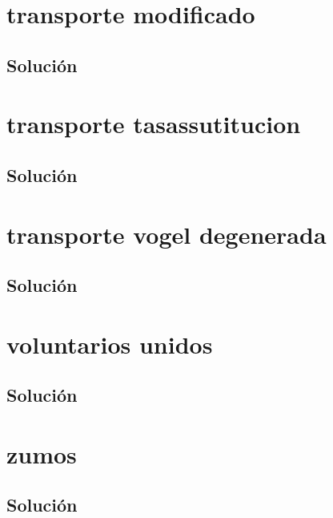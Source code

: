 \documentclass[a4paper,10pt,onecolumn]{report}
\begin{document}
\section{transporte modificado}

\subsection*{Solución}

\clearpage
\section{transporte tasassutitucion}

\subsection*{Solución}

\clearpage
\section{transporte vogel degenerada}

\subsection*{Solución}

\clearpage
\section{voluntarios unidos}

\subsection*{Solución}

\clearpage
\section{zumos}

\subsection*{Solución}

\clearpage
\end{document}
